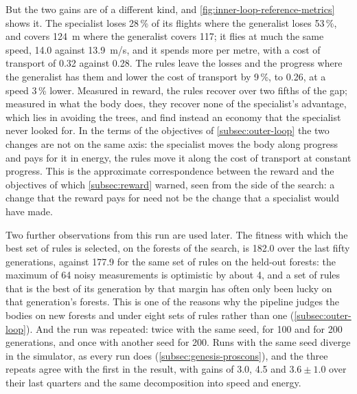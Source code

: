 But the two gains are of a different kind, and \autoref{fig:inner-loop-reference-metrics} shows it. The specialist loses 28\,\% of its flights where the generalist loses 53\,\%, and covers 124~m where the generalist covers 117; it flies at much the same speed, 14.0 against 13.9~m/s, and it spends more per metre, with a cost of transport of 0.32 against 0.28. The rules leave the losses and the progress where the generalist has them and lower the cost of transport by 9\,\%, to 0.26, at a speed 3\,\% lower. Measured in reward, the rules recover over two fifths of the gap; measured in what the body does, they recover none of the specialist's advantage, which lies in avoiding the trees, and find instead an economy that the specialist never looked for. In the terms of the objectives of \autoref{subsec:outer-loop} the two changes are not on the same axis: the specialist moves the body along progress and pays for it in energy, the rules move it along the cost of transport at constant progress. This is the approximate correspondence between the reward and the objectives of which \autoref{subsec:reward} warned, seen from the side of the search: a change that the reward pays for need not be the change that a specialist would have made.

Two further observations from this run are used later. The fitness with which the best set of rules is selected, on the forests of the search, is 182.0 over the last fifty generations, against 177.9 for the same set of rules on the held-out forests: the maximum of 64 noisy measurements is optimistic by about 4, and a set of rules that is the best of its generation by that margin has often only been lucky on that generation's forests. This is one of the reasons why the pipeline judges the bodies on new forests and under eight sets of rules rather than one (\autoref{subsec:outer-loop}). And the run was repeated: twice with the same seed, for 100 and for 200 generations, and once with another seed for 200. Runs with the same seed diverge in the simulator, as every run does (\autoref{subsec:genesis-proscons}), and the three repeats agree with the first in the result, with gains of 3.0, 4.5 and $3.6 \pm 1.0$ over their last quarters and the same decomposition into speed and energy.


